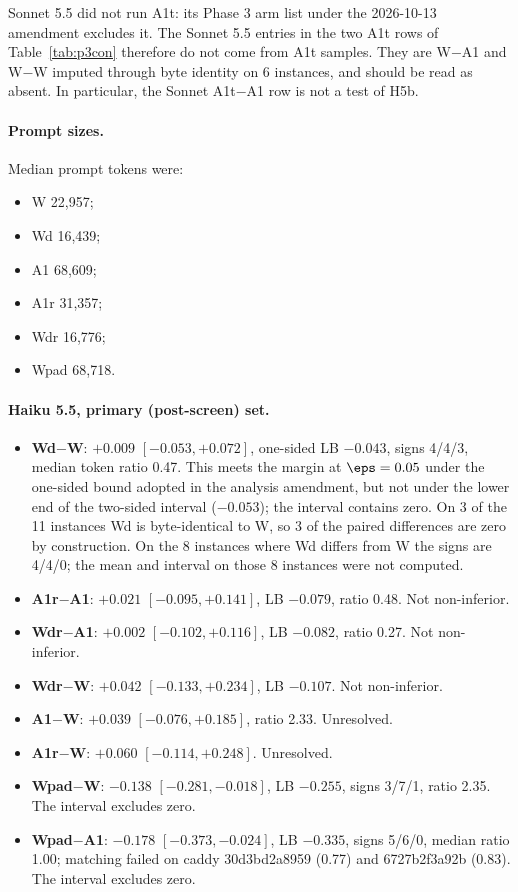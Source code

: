 Sonnet 5.5 did not run A1t: its Phase 3 arm list under the 2026-10-13 amendment excludes it. The Sonnet 5.5 entries in the two A1t rows of Table~\ref{tab:p3con} therefore do not come from A1t samples. They are W$-$A1 and W$-$W imputed through byte identity on 6 instances, and should be read as absent. In particular, the Sonnet A1t$-$A1 row is not a test of H5b.

\paragraph{Prompt sizes.} Median prompt tokens were:
\begin{itemize}
\item W 22,957;
\item Wd 16,439;
\item A1 68,609;
\item A1r 31,357;
\item Wdr 16,776;
\item Wpad 68,718.
\end{itemize}

\paragraph{Haiku 5.5, primary (post-screen) set.}
\begin{itemize}
\item \textbf{Wd$-$W}: $+0.009$ $[-0.053, +0.072]$, one-sided LB $-0.043$, signs 4/4/3, median token ratio 0.47. This meets the margin at $\eps = 0.05$ under the one-sided bound adopted in the analysis amendment, but not under the lower end of the two-sided interval ($-0.053$); the interval contains zero. On 3 of the 11 instances Wd is byte-identical to W, so 3 of the paired differences are zero by construction. On the 8 instances where Wd differs from W the signs are 4/4/0; the mean and interval on those 8 instances were not computed.
\item \textbf{A1r$-$A1}: $+0.021$ $[-0.095, +0.141]$, LB $-0.079$, ratio 0.48. Not non-inferior.
\item \textbf{Wdr$-$A1}: $+0.002$ $[-0.102, +0.116]$, LB $-0.082$, ratio 0.27. Not non-inferior.
\item \textbf{Wdr$-$W}: $+0.042$ $[-0.133, +0.234]$, LB $-0.107$. Not non-inferior.
\item \textbf{A1$-$W}: $+0.039$ $[-0.076, +0.185]$, ratio 2.33. Unresolved.
\item \textbf{A1r$-$W}: $+0.060$ $[-0.114, +0.248]$. Unresolved.
\item \textbf{Wpad$-$W}: $-0.138$ $[-0.281, -0.018]$, LB $-0.255$, signs 3/7/1, ratio 2.35. The interval excludes zero.
\item \textbf{Wpad$-$A1}: $-0.178$ $[-0.373, -0.024]$, LB $-0.335$, signs 5/6/0, median ratio 1.00; matching failed on caddy 30d3bd2a8959 (0.77) and 6727b2f3a92b (0.83). The interval excludes zero.
\end{itemize}


